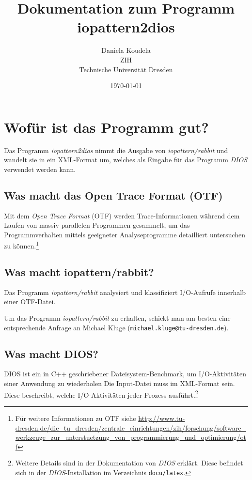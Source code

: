 \documentclass{scrartcl}
\title{Dokumentation zum Programm iopattern2dios}
\author{Daniela Koudela\\ ZIH\\ Technische Universität Dresden}
\date{\today}
\newcommand\email[1]{\texttt{#1}}
\begin{document}
\maketitle
\tableofcontents
\section{Wofür ist das Programm gut?} %
Das Programm \emph{iopattern2dios} nimmt die Ausgabe von 
\emph{iopattern/rabbit} 
und wandelt sie in ein XML-Format um, welches als Eingabe für das Programm 
\emph{DIOS} verwendet werden kann.

\subsection{Was macht das Open Trace Format (OTF)} %
Mit dem \emph{Open Trace Format} (OTF) werden Trace-Informationen während dem 
Laufen von massiv parallelen Programmen gesammelt, um das Programmverhalten
mittels geeigneter Analyseprogramme detailliert untersuchen zu 
können.\footnote{Für weitere Informationen zu OTF siehe
\url{http://www.tu-dresden.de/die_tu_dresden/zentrale_einrichtungen/zih/forschung/software_werkzeuge_zur_unterstuetzung_von_programmierung_und_optimierung/otf}}

\subsection{Was macht iopattern/rabbit?} %
Das Programm \emph{iopattern/rabbit} analysiert und klassifiziert I/O-Aufrufe
innerhalb einer OTF-Datei.

Um das Programm \emph{iopattern/rabbit} zu erhalten, schickt man am besten eine
entsprechende Anfrage an Michael Kluge (\email{michael.kluge@tu-dresden.de}).

\subsection{Was macht DIOS?} %
DIOS ist ein in C++ geschriebener Dateisystem-Benchmark, 
um I/O-Aktivitäten einer Anwendung zu wiederholen
Die Input-Datei muss im XML-Format sein. Diese beschreibt, welche 
I/O-Aktivitäten jeder Prozess ausführt.\footnote{Weitere Details sind in 
der Dokumentation von \emph{DIOS} erklärt. Diese befindet sich in der 
\emph{DIOS}-Installation im Verzeichnis \texttt{docu/latex}.}
\end{document}
